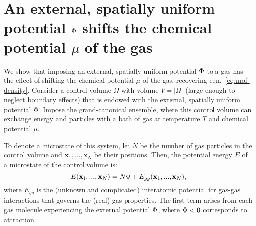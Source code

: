 \setcounter{table}{0}
\renewcommand{\thetable}{S\arabic{table}}%
\setcounter{figure}{0}
\renewcommand{\thefigure}{S\arabic{figure}}%
\renewcommand{\thesection}{SI \Alph{section}}%

\section{An external, spatially uniform potential $\Phi$ shifts the chemical potential $\mu$ of the gas} \label{sec:V_shifts_chem_pot}
We show that imposing an external, spatially uniform potential $\Phi$ to a gas
has the effect of shifting the chemical potential $\mu$ of the gas, recovering
eqn.~\ref{eq:mof-density}. Consider a control volume $\Omega$ with volume
$V=|\Omega|$ (large enough to neglect boundary effects) that is endowed with
the external, spatially uniform potential $\Phi$. Impose the grand-canonical
ensemble, where this control volume can exchange energy and particles with a
bath of gas at temperature $T$ and chemical potential $\mu$.

To denote a microstate of this system, let $N$ be the number of gas particles
in the control volume and $\mathbf{x}_1,...,\mathbf{x}_N$ be their positions.
Then, the potential energy $E$ of a microstate of the control volume is:
\begin{equation} E(\mathbf{x}_1,...,\mathbf{x}_N) = N\Phi +
E_{gg}(\mathbf{x}_1,...,\mathbf{x}_N), \end{equation} where $E_{gg}$ is the
(unknown and complicated) interatomic potential for gas-gas interactions that
governs the (real) gas properties. The first term arises from each gas molecule
experiencing the external potential $\Phi$, where $\Phi < 0$ corresponds to
attraction.


